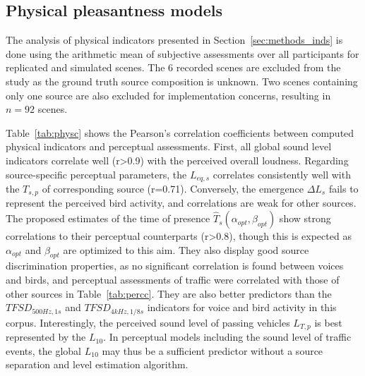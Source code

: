 \documentclass[twocolumn]{article}
\begin{document}
\subsection{Physical pleasantness models}
\label{sec:results_phys}

The analysis of physical indicators presented in Section~\ref{sec:methods_inds} is done using the arithmetic mean of subjective assessments over all participants for replicated and simulated scenes. The 6 recorded scenes are excluded from the study as the ground truth source composition is unknown. Two scenes containing only one source are also excluded for implementation concerns, resulting in $n=92$ scenes.

Table~\ref{tab:physc} shows the Pearson's correlation coefficients between computed physical indicators and perceptual assessments. First, all global sound level indicators correlate well (r>0.9) with the perceived overall loudness. Regarding source-specific perceptual parameters, the $L_{eq, s}$ correlates consistently well with the $T_{s, p}$ of corresponding source (r=0.71). Conversely, the emergence $\Delta L_s$ fails to represent the perceived bird activity, and correlations are weak for other sources. The proposed estimates of the time of presence $\hat T_s(\alpha_{opt}, \beta_{opt})$ show strong correlations to their perceptual counterparts (r>0.8), though this is expected as $\alpha_{opt}$ and $\beta_{opt}$ are optimized to this aim. They also display good source discrimination properties, as no significant correlation is found between voices and birds, and perceptual assessments of traffic were correlated with those of other sources in Table~\ref{tab:percc}. They are also better predictors than the $TFSD_{500Hz, 1s}$ and $TFSD_{4kHz, 1/8s}$ indicators for voice and bird activity in this corpus. Interestingly, the perceived sound level of passing vehicles $L_{T, p}$ is best represented by the $L_{10}$. In perceptual models including the sound level of traffic events, the global $L_{10}$ may thus be a sufficient predictor without a source separation and level estimation algorithm.
\end{document}

